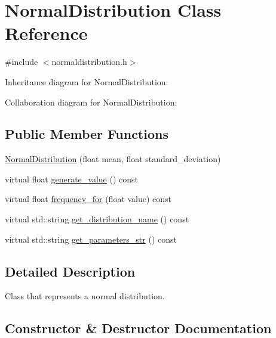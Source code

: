 \hypertarget{classNormalDistribution}{}\section{Normal\+Distribution Class Reference}
\label{classNormalDistribution}


{\ttfamily \#include $<$normaldistribution.\+h$>$}



Inheritance diagram for Normal\+Distribution\+:


Collaboration diagram for Normal\+Distribution\+:
\subsection*{Public Member Functions}
\begin{DoxyCompactItemize}
\item 
\hyperlink{classNormalDistribution_a329f8413620c0bfbe2fca4e3ef958de5}{Normal\+Distribution} (float mean, float standard\+\_\+deviation)
\item 
virtual float \hyperlink{classNormalDistribution_a121b2abfc13fc376512aa4f7e2fb1bb4}{generate\+\_\+value} () const
\item 
virtual float \hyperlink{classNormalDistribution_a9e53ead03edb6441713d84eaa73976dd}{frequency\+\_\+for} (float value) const
\item 
virtual std\+::string \hyperlink{classNormalDistribution_a13afb9f11a9d643ff1af5de2ca066005}{get\+\_\+distribution\+\_\+name} () const
\item 
virtual std\+::string \hyperlink{classNormalDistribution_acedea04da0d96d01ed5c7fde83a56e1c}{get\+\_\+parameters\+\_\+str} () const
\end{DoxyCompactItemize}


\subsection{Detailed Description}
Class that represents a normal distribution. 

\subsection{Constructor \& Destructor Documentation}
\mbox{\label{classNormalDistribution_a329f8413620c0bfbe2fca4e3ef958de5}} 
